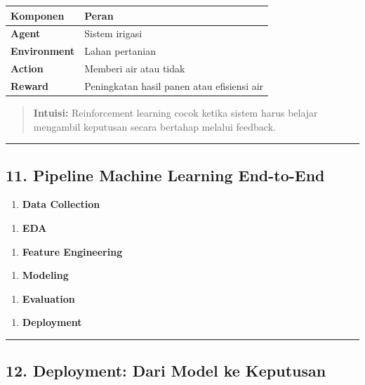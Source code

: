 \documentclass[12pt,a4paper]{article}
\begin{document}
\begin{tabular}{|l|l|}
\hline
Komponen & Peran \\
\hline
\textbf{Agent} & Sistem irigasi \\
\hline
\textbf{Environment} & Lahan pertanian \\
\hline
\textbf{Action} & Memberi air atau tidak \\
\hline
\textbf{Reward} & Peningkatan hasil panen atau efisiensi air \\
\hline
\end{tabular}


\begin{quote}
\textbf{Intuisi:} Reinforcement learning cocok ketika sistem harus belajar mengambil keputusan secara bertahap melalui feedback.\end{quote}


\hrule


\subsection{11. Pipeline Machine Learning End-to-End}


\begin{enumerate}
\item \textbf{Data Collection}
\end{enumerate}


\begin{enumerate}
\item \textbf{EDA}
\end{enumerate}


\begin{enumerate}
\item \textbf{Feature Engineering}
\end{enumerate}


\begin{enumerate}
\item \textbf{Modeling}
\end{enumerate}


\begin{enumerate}
\item \textbf{Evaluation}
\end{enumerate}


\begin{enumerate}
\item \textbf{Deployment}
\end{enumerate}


\hrule


\subsection{12. Deployment: Dari Model ke Keputusan}
\end{document}
